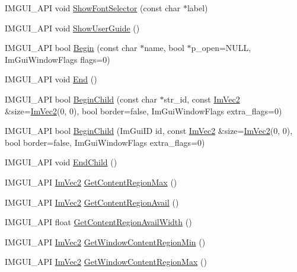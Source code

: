 \begin{DoxyCompactItemize}
\item 
I\+M\+G\+U\+I\+\_\+\+A\+PI void \hyperlink{namespace_im_gui_a0bdce99eef17ef1e1fef40a18bd811ab}{Show\+Font\+Selector} (const char $\ast$label)
\item 
I\+M\+G\+U\+I\+\_\+\+A\+PI void \hyperlink{namespace_im_gui_ad6f4919bc9aa806ca8d2c1d6e2bfb051}{Show\+User\+Guide} ()
\item 
I\+M\+G\+U\+I\+\_\+\+A\+PI bool \hyperlink{namespace_im_gui_a581e58db0bc930bafa4a5d23093a2b99}{Begin} (const char $\ast$name, bool $\ast$p\+\_\+open=N\+U\+LL, Im\+Gui\+Window\+Flags flags=0)
\item 
I\+M\+G\+U\+I\+\_\+\+A\+PI void \hyperlink{namespace_im_gui_a5479d93794a004c67ceb6d13f37c8254}{End} ()
\item 
I\+M\+G\+U\+I\+\_\+\+A\+PI bool \hyperlink{namespace_im_gui_a93b10a516e6da427b743906ad97d7f16}{Begin\+Child} (const char $\ast$str\+\_\+id, const \hyperlink{struct_im_vec2}{Im\+Vec2} \&size=\hyperlink{struct_im_vec2}{Im\+Vec2}(0, 0), bool border=false, Im\+Gui\+Window\+Flags extra\+\_\+flags=0)
\item 
I\+M\+G\+U\+I\+\_\+\+A\+PI bool \hyperlink{namespace_im_gui_a3320a3f36d9d8b227f93a015792379d3}{Begin\+Child} (Im\+Gui\+ID id, const \hyperlink{struct_im_vec2}{Im\+Vec2} \&size=\hyperlink{struct_im_vec2}{Im\+Vec2}(0, 0), bool border=false, Im\+Gui\+Window\+Flags extra\+\_\+flags=0)
\item 
I\+M\+G\+U\+I\+\_\+\+A\+PI void \hyperlink{namespace_im_gui_af8de559a88c1442d6df8c1b04c86e997}{End\+Child} ()
\item 
I\+M\+G\+U\+I\+\_\+\+A\+PI \hyperlink{struct_im_vec2}{Im\+Vec2} \hyperlink{namespace_im_gui_a0a4dbfabbfa45d74319ef541962ce2eb}{Get\+Content\+Region\+Max} ()
\item 
I\+M\+G\+U\+I\+\_\+\+A\+PI \hyperlink{struct_im_vec2}{Im\+Vec2} \hyperlink{namespace_im_gui_a410c8e19b2fea8b52746ca11b3930301}{Get\+Content\+Region\+Avail} ()
\item 
I\+M\+G\+U\+I\+\_\+\+A\+PI float \hyperlink{namespace_im_gui_a52e3311f46626a5d0369139d20da993a}{Get\+Content\+Region\+Avail\+Width} ()
\item 
I\+M\+G\+U\+I\+\_\+\+A\+PI \hyperlink{struct_im_vec2}{Im\+Vec2} \hyperlink{namespace_im_gui_a790123aa15c266798f35050ba36b7197}{Get\+Window\+Content\+Region\+Min} ()
\item 
I\+M\+G\+U\+I\+\_\+\+A\+PI \hyperlink{struct_im_vec2}{Im\+Vec2} \hyperlink{namespace_im_gui_a96ce6060592d3ef975594357e650adc6}{Get\+Window\+Content\+Region\+Max} ()
\item 

\end{DoxyCompactItemize}
